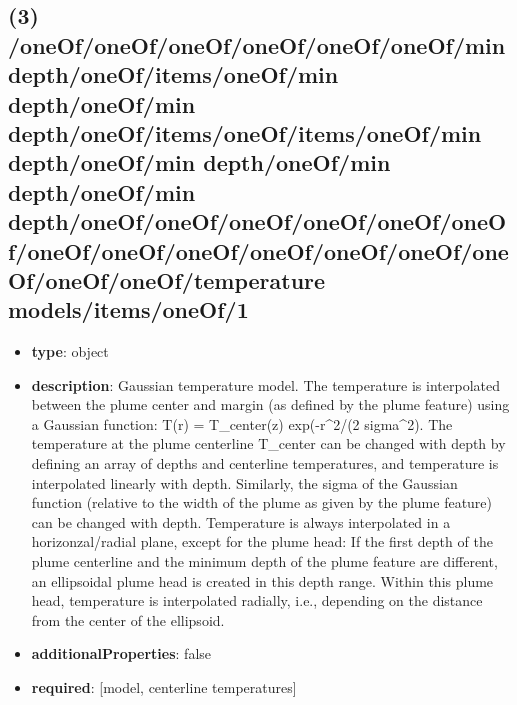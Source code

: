\subsection{(3) /oneOf/oneOf/oneOf/oneOf/oneOf/oneOf/min depth/oneOf/items/oneOf/min depth/oneOf/min depth/oneOf/items/oneOf/items/oneOf/min depth/oneOf/min depth/oneOf/min depth/oneOf/min depth/oneOf/oneOf/oneOf/oneOf/oneOf/oneOf/oneOf/oneOf/oneOf/oneOf/oneOf/oneOf/oneOf/oneOf/oneOf/temperature models/items/oneOf/1}
\begin{itemize}[leftmargin=3em]\item {\bf type}: object
\item {\bf description}: Gaussian temperature model. The temperature is interpolated between the plume center and margin (as defined by the plume feature) using a Gaussian function: T(r) = T_center(z) exp(-r^2/(2 sigma^2). The temperature at the plume centerline T_center can be changed with depth by defining an array of depths and centerline temperatures, and temperature is interpolated linearly with depth. Similarly, the sigma of the Gaussian function (relative to the width of the plume as given by the plume feature) can be changed with depth. Temperature is always interpolated in a horizonzal/radial plane, except for the plume head: If the first depth of the plume centerline and the minimum depth of the plume feature are different, an ellipsoidal plume head is created in this depth range. Within this plume head, temperature is interpolated radially, i.e., depending on the distance from the center of the ellipsoid.
\item {\bf additionalProperties}: false
\item {\bf required}: [model, centerline temperatures]\end{itemize}
